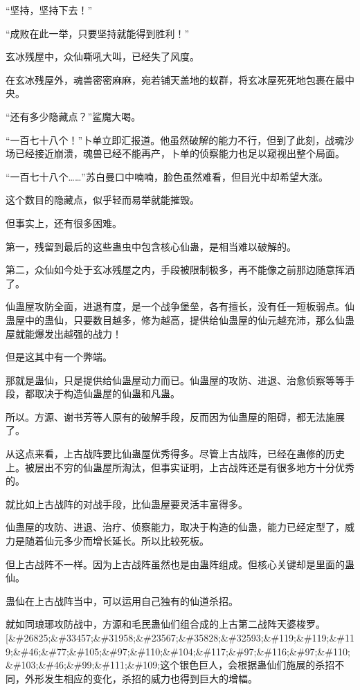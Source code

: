 
\begin{this_body}

“坚持，坚持下去！”

“成败在此一举，只要坚持就能得到胜利！”

玄冰残屋中，众仙嘶吼大叫，已经失了风度。

在玄冰残屋外，魂兽密密麻麻，宛若铺天盖地的蚁群，将玄冰屋死死地包裹在最中央。

“还有多少隐藏点？”鲨魔大喝。

“一百七十八个！”卜单立即汇报道。他虽然破解的能力不行，但到了此刻，战魂沙场已经接近崩溃，魂兽已经不能再产，卜单的侦察能力也足以窥视出整个局面。

“一百七十八个……”苏白曼口中喃喃，脸色虽然难看，但目光中却希望大涨。

这个数目的隐藏点，似乎轻而易举就能摧毁。

但事实上，还有很多困难。

第一，残留到最后的这些蛊虫中包含核心仙蛊，是相当难以破解的。

第二，众仙如今处于玄冰残屋之内，手段被限制极多，再不能像之前那边随意挥洒了。

仙蛊屋攻防全面，进退有度，是一个战争堡垒，各有擅长，没有任一短板弱点。仙蛊屋中的蛊仙，只要数目越多，修为越高，提供给仙蛊屋的仙元越充沛，那么仙蛊屋就能爆发出越强的战力！

但是这其中有一个弊端。

那就是蛊仙，只是提供给仙蛊屋动力而已。仙蛊屋的攻防、进退、治愈侦察等等手段，都取决于构造仙蛊屋的仙蛊和凡蛊。

所以。方源、谢书芳等人原有的破解手段，反而因为仙蛊屋的阻碍，都无法施展了。

从这点来看，上古战阵要比仙蛊屋优秀得多。尽管上古战阵，已经在蛊修的历史上。被层出不穷的仙蛊屋所淘汰，但事实证明，上古战阵还是有很多地方十分优秀的。

就比如上古战阵的对战手段，比仙蛊屋要灵活丰富得多。

仙蛊屋的攻防、进退、治疗、侦察能力，取决于构造的仙蛊，能力已经定型了，威力是随着仙元多少而增长延长。所以比较死板。

但上古战阵不一样。因为上古战阵虽然也是由蛊阵组成。但核心关键却是里面的蛊仙。

蛊仙在上古战阵当中，可以运用自己独有的仙道杀招。

就如同琅琊攻防战中，方源和毛民蛊仙们组合成的上古第二战阵天婆梭罗。[\&\#26825;\&\#33457;\&\#31958;\&\#23567;\&\#35828;\&\#32593;\&\#119;\&\#119;\&\#119;\&\#46;\&\#77;\&\#105;\&\#97;\&\#110;\&\#104;\&\#117;\&\#97;\&\#116;\&\#97;\&\#110;\&\#103;\&\#46;\&\#99;\&\#111;\&\#109;这个银色巨人，会根据蛊仙们施展的杀招不同，外形发生相应的变化，杀招的威力也得到巨大的增幅。


\end{this_body}

